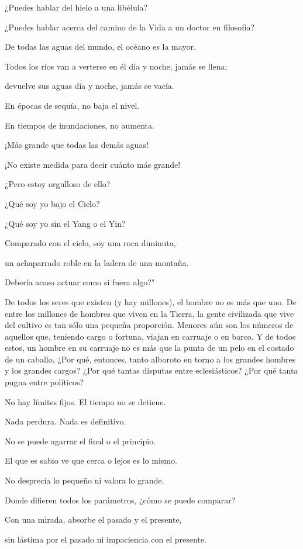 ¿Puedes hablar del hielo a una libélula?

¿Puedes hablar acerca del camino de la Vida a un doctor en filosofía?

De todas las aguas del mundo, el océano es la mayor.

Todos los ríos van a verterse en él día y noche, jamás se llena;

devuelve sus aguas día y noche, jamás se vacía.

En épocas de sequía, no baja el nivel.

En tiempos de inundaciones, no aumenta.

¡Más grande que todas las demás aguas!

¡No existe medida para decir cuánto más grande!

¿Pero estoy orgulloso de ello?

¿Qué soy yo bajo el Cielo?

¿Qué soy yo sin el Yang o el Yin?

Comparado con el cielo, soy una roca diminuta,

un achaparrado roble en la ladera de una montaña.

Debería acaso actuar como si fuera algo?"

De todos los seres que existen (y hay millones), el hombre no es más que
uno. De entre los millones de hombres que viven en la Tierra, la gente
civilizada que vive del cultivo es tan sólo una pequeña proporción.
Menores aún son los números de aquellos que, teniendo cargo o fortuna,
viajan en carruaje o en barco. Y de todos estos, un hombre en su
carruaje no es más que la punta de un pelo en el costado de un caballo,
¿Por qué, entonces, tanto alboroto en torno a los grandes hombres y los
grandes cargos? ¿Por qué tantas disputas entre eclesiásticos? ¿Por qué
tanta pugna entre políticos?

No hay límites fijos. El tiempo no se detiene.

Nada perdura. Nada es definitivo.

No se puede agarrar el final o el principio.

El que es sabio ve que cerca o lejos es lo mismo.

No desprecia lo pequeño ni valora lo grande.

Donde difieren todos los parámetros, ¿cómo se puede comparar?

Con una mirada, absorbe el pasado y el presente,

sin lástima por el pasado ni impaciencia con el presente.

